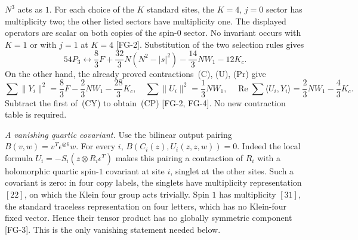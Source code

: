 $N^3$ acts as $1$. For each choice of the $K$ standard sites, the
$K=4$, $j=0$ sector has multiplicity two; the other listed sectors have
multiplicity one. The displayed operators are scalar on both copies of
the spin-$0$ sector. No invariant occurs with $K=1$ or with $j=1$ at $K=4$ [FG-2].
Substitution of the two selection rules gives
\[
 54P_3\longleftrightarrow
 \frac83F+\frac{32}{3}N(N^2-|s|^2)-\frac{14}{3}NW_1-12K_c.
\]
On the other hand, the already proved contractions~(C), (U), (Pr) give
\[
 \sum\|Y_i\|^2=\frac83F-\frac23NW_1-\frac{28}{3}K_c,
 \quad \sum\|U_i\|^2=\frac13NW_1,
 \quad \operatorname{Re}\sum\langle U_i,Y_i\rangle
       =\frac23NW_1-\frac43K_c.
 \tag{CY}\label{eq:fqe-cubic-mixed-norms}
\]
Subtract the first of~(CY) to obtain~(CP) [FG-2, FG-4].
No new contraction table is required.

\emph{A vanishing quartic covariant.}
Use the bilinear output pairing $B(v,w)=v^T\epsilon^{\otimes6}w$.
For every $i$, $B(C_i(z),U_i(z,z,w))=0$.
Indeed the local formula $U_i=-S_i(z\otimes R_i\epsilon^T)$ makes this
pairing a contraction of $R_i$ with a holomorphic quartic spin-$1$
covariant at site $i$, singlet at the other sites. Such a covariant is zero:
in four copy labels, the singlets have multiplicity representation
$[22]$, on which the Klein four group acts trivially. Spin $1$ has
multiplicity $[31]$, the standard traceless representation on four letters,
which has no Klein-four fixed vector. Hence their tensor product has
no globally symmetric component [FG-3]. This is the only vanishing statement
needed below.

